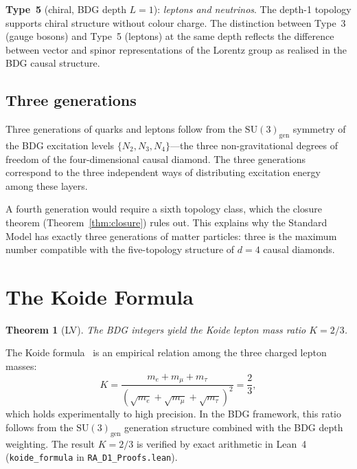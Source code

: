 \documentclass[12pt,a4paper]{article}
\newtheorem{theorem}{Theorem}[section]
\begin{document}
\textbf{Type~5} (chiral, BDG depth $L=1$): \emph{leptons and neutrinos}. The depth-1 topology supports chiral structure without colour charge. The distinction between Type~3 (gauge bosons) and Type~5 (leptons) at the same depth reflects the difference between vector and spinor representations of the Lorentz group as realised in the BDG causal structure.

\subsection{Three generations}\label{sec:generations}

Three generations of quarks and leptons follow from the $\mathrm{SU}(3)_{\mathrm{gen}}$ symmetry of the BDG excitation levels $\{N_2, N_3, N_4\}$---the three non-gravitational degrees of freedom of the four-dimensional causal diamond. The three generations correspond to the three independent ways of distributing excitation energy among these layers.

A fourth generation would require a sixth topology class, which the closure theorem (Theorem~\ref{thm:closure}) rules out. This explains why the Standard Model has exactly three generations of matter particles: three is the maximum number compatible with the five-topology structure of $d=4$ causal diamonds.

\section{The Koide Formula}\label{sec:koide}

\begin{theorem}[LV]\label{thm:koide}
The BDG integers yield the Koide lepton mass ratio $K = 2/3$.
\end{theorem}

The Koide formula~\cite{Koide1982} is an empirical relation among the three charged lepton masses:
\begin{equation}
K = \frac{m_e + m_\mu + m_\tau}{\left(\sqrt{m_e} + \sqrt{m_\mu} + \sqrt{m_\tau}\right)^2} = \frac{2}{3},
\label{eq:koide}
\end{equation}
which holds experimentally to high precision. In the BDG framework, this ratio follows from the $\mathrm{SU}(3)_{\mathrm{gen}}$ generation structure combined with the BDG depth weighting. The result $K=2/3$ is verified by exact arithmetic in Lean~4 (\texttt{koide\_formula} in \texttt{RA\_D1\_Proofs.lean}).
\end{document}
